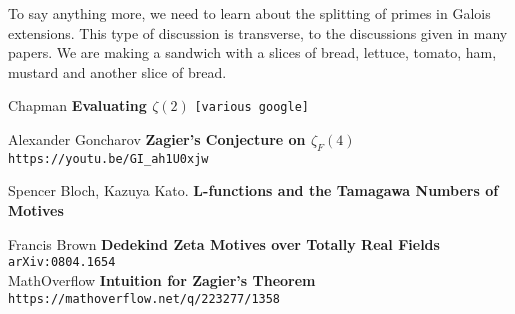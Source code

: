 \documentclass[12pt]{article}
\begin{document}
\newpage

\noindent  To say anything more, we need to learn about the splitting of primes in Galois extensions.  This type of discussion is transverse, to the discussions given in many papers.  We are making a sandwich with a slices of bread, lettuce, tomato, ham, mustard and another slice of bread.

\vfill

\begin{thebibliography}{}

\item Chapman \textbf{Evaluating $\zeta(2)$} \texttt{[various google]}

\item Alexander Goncharov \textbf{Zagier's Conjecture on $\zeta_F(4)$} \texttt{https://youtu.be/GI\_{}ah1U0xjw}

\item Spencer Bloch, Kazuya Kato. \textbf{L-functions and the Tamagawa Numbers of Motives}

\item Francis Brown \textbf{Dedekind Zeta Motives over Totally Real Fields} \texttt{arXiv:0804.1654} \\
MathOverflow \textbf{Intuition for Zagier's Theorem} \texttt{https://mathoverflow.net/q/223277/1358}
\end{thebibliography}
\end{document}
